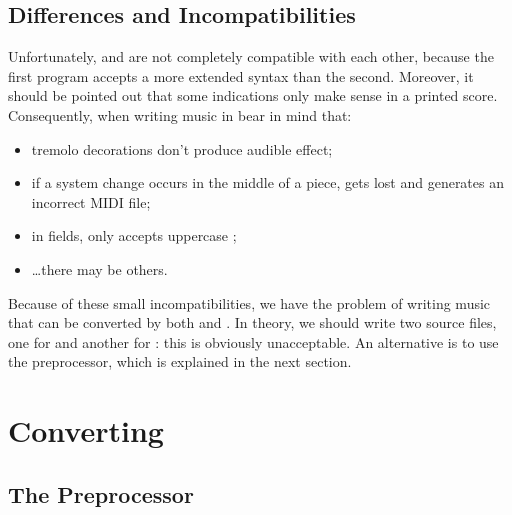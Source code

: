 \documentclass[a4paper,fullpage,12pt]{book}
\begin{document}



\section{Differences and Incompatibilities}

Unfortunately, \abcm{} and \abcmid{} are not completely compatible
with each other, because the first program accepts a more extended
syntax than the second. Moreover, it should be pointed out that some
indications only make sense in a printed score. Consequently, when
writing music in \ABC{} bear in mind that:

\begin{itemize}
  
  \item tremolo decorations don't produce audible effect;
  
  \item if a system change occurs in the middle of a piece, \abcmid{}
  gets lost and generates an incorrect MIDI file;
  
  \item in  fields, \abcmid{} only accepts uppercase
  ;
  
  \item {\ldots}there may be others. %
  
\end{itemize}

Because of these small incompatibilities, we have the problem of writing
music that can be converted by both \abcm{} and \abcmid. In theory, we
should write two source files, one for \abcm{} and another for \abcmid{}:
this is obviously unacceptable. An alternative is to use the \abcpp{}
preprocessor, which is explained in the next section.


\noteseparator


\chapter{Converting}

\section{The \abcpp{} Preprocessor}
\label{sec:abcpp}
\end{document}
